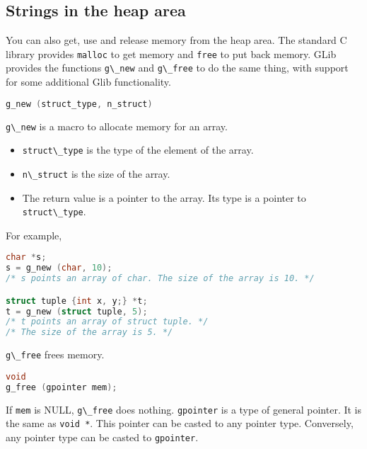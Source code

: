 \hypertarget{strings-in-the-heap-area}{%
\subsection{Strings in the heap area}\label{strings-in-the-heap-area}}

You can also get, use and release memory from the heap area. The
standard C library provides \passthrough{\lstinline!malloc!} to get
memory and \passthrough{\lstinline!free!} to put back memory. GLib
provides the functions \passthrough{\lstinline!g\_new!} and
\passthrough{\lstinline!g\_free!} to do the same thing, with support for
some additional Glib functionality.

\begin{lstlisting}[language=C]
g_new (struct_type, n_struct)
\end{lstlisting}

\passthrough{\lstinline!g\_new!} is a macro to allocate memory for an
array.

\begin{itemize}
\tightlist
\item
  \passthrough{\lstinline!struct\_type!} is the type of the element of
  the array.
\item
  \passthrough{\lstinline!n\_struct!} is the size of the array.
\item
  The return value is a pointer to the array. Its type is a pointer to
  \passthrough{\lstinline!struct\_type!}.
\end{itemize}

For example,

\begin{lstlisting}[language=C]
char *s;
s = g_new (char, 10);
/* s points an array of char. The size of the array is 10. */

struct tuple {int x, y;} *t;
t = g_new (struct tuple, 5);
/* t points an array of struct tuple. */
/* The size of the array is 5. */
\end{lstlisting}

\passthrough{\lstinline!g\_free!} frees memory.

\begin{lstlisting}[language=C]
void
g_free (gpointer mem);
\end{lstlisting}

If \passthrough{\lstinline!mem!} is NULL,
\passthrough{\lstinline!g\_free!} does nothing.
\passthrough{\lstinline!gpointer!} is a type of general pointer. It is
the same as \passthrough{\lstinline!void *!}. This pointer can be casted
to any pointer type. Conversely, any pointer type can be casted to
\passthrough{\lstinline!gpointer!}.

